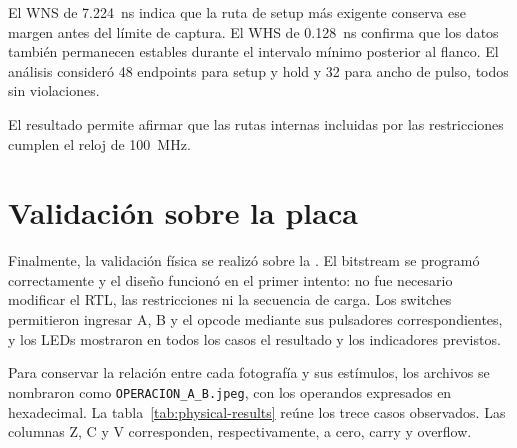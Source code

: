 El WNS de \SI{7,224}{\nano\second} indica que la ruta de setup más
exigente conserva ese margen antes del límite de captura. El WHS de
\SI{0,128}{\nano\second} confirma que los datos también permanecen
estables durante el intervalo mínimo posterior al flanco. El análisis
consideró 48 endpoints para setup y hold y 32 para ancho de pulso,
todos sin violaciones.

El resultado permite afirmar que las rutas internas incluidas por las
restricciones cumplen el reloj de \SI{100}{\mega\hertz}.

\section{Validación sobre la placa}

Finalmente, la validación física se realizó sobre la . El bitstream se programó correctamente y el diseño funcionó en el
primer intento: no fue necesario modificar el RTL, las restricciones
ni la secuencia de carga. Los switches permitieron ingresar A, B y el
opcode mediante sus pulsadores correspondientes, y los LEDs mostraron
en todos los casos el resultado y los indicadores previstos.

Para conservar la relación entre cada fotografía y sus estímulos, los
archivos se nombraron como \texttt{OPERACION\_A\_B.jpeg}, con los
operandos expresados en hexadecimal. La
tabla~\ref{tab:physical-results} reúne los trece casos observados.
Las columnas Z, C y V corresponden, respectivamente, a cero, carry y overflow.

